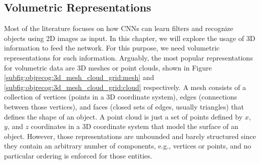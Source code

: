 \subsection{Volumetric Representations}
\label{cha:objrecog:sec:relatedworks:subsec:representations}

Most of the literature focuses on how \acp{CNN} can learn filters and recognize objects using \acs{2D} images as input. In this chapter, we will explore the usage of \acs{3D} information to feed the network. For this purpose, we need volumetric representations for such information. Arguably, the most popular representations for volumetric data are \acs{3D} meshes or point clouds, shown in Figure \ref{subfig:objrecog:3d_mesh_cloud_grid:mesh} and \ref{subfig:objrecog:3d_mesh_cloud_grid:cloud} respectively. A mesh consists of a collection of vertices (points in a \ac{3D} coordinate system), edges (connections between those vertices), and faces (closed sets of edges, usually triangles) that defines the shape of an object. A point cloud is just a set of points defined by $x$, $y$, and $z$ coordinates in a \acl{3D} coordinate system that model the surface of an object. However, those representations are unbounded and barely structured since they contain an arbitrary number of components, e.g., vertices or points, and no particular ordering is enforced for those entities.

